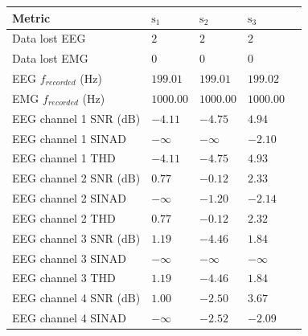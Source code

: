 \begin{table}[ht]
	\centering
	\begin{tabular}{|l|l|l|l|l|}
			\hline
			Metric                                & $\text{s}_1$      & $\text{s}_2$      &   $\text{s}_3$            \\
			\hline
			Data lost EEG                         & $2$               & $2$               & $2$                       \\
			Data lost EMG                         & $0$               & $0$               & $0$                       \\
			EEG $f_{recorded}$ ($\text{Hz}$)      & $199.01$          & $199.01$          & $199.02$                  \\
            EMG $f_{recorded}$ ($\text{Hz}$)      & $1000.00$         & $1000.00$         & $1000.00$                 \\
            EEG channel 1 SNR ($\text{dB}$)       & $-4.11$           & $-4.75$           & $4.94$                    \\
            EEG channel 1 SINAD                   & $-\infty$         & $-\infty$         & $-2.10$                   \\
            EEG channel 1 THD                     & $-4.11$           & $-4.75$           & $4.93$                    \\
            EEG channel 2 SNR ($\text{dB}$)       & $0.77$            & $-0.12$           & $2.33$                    \\
            EEG channel 2 SINAD                   & $-\infty$         & $-1.20$           & $-2.14$                   \\
            EEG channel 2 THD                     & $0.77$            & $-0.12$           & $2.32$                    \\
            EEG channel 3 SNR ($\text{dB}$)       & $1.19$            & $-4.46$           & $1.84$                    \\
            EEG channel 3 SINAD                   & $-\infty$         & $-\infty$         & $-\infty$                 \\
            EEG channel 3 THD                     & $1.19$            & $-4.46$           & $1.84$                    \\
            EEG channel 4 SNR ($\text{dB}$)       & $1.00$            & $-2.50$           & $3.67$                    \\
            EEG channel 4 SINAD                   & $-\infty$         & $-2.52$           & $-2.09$                   \\

\end{tabular}
\end{table}
